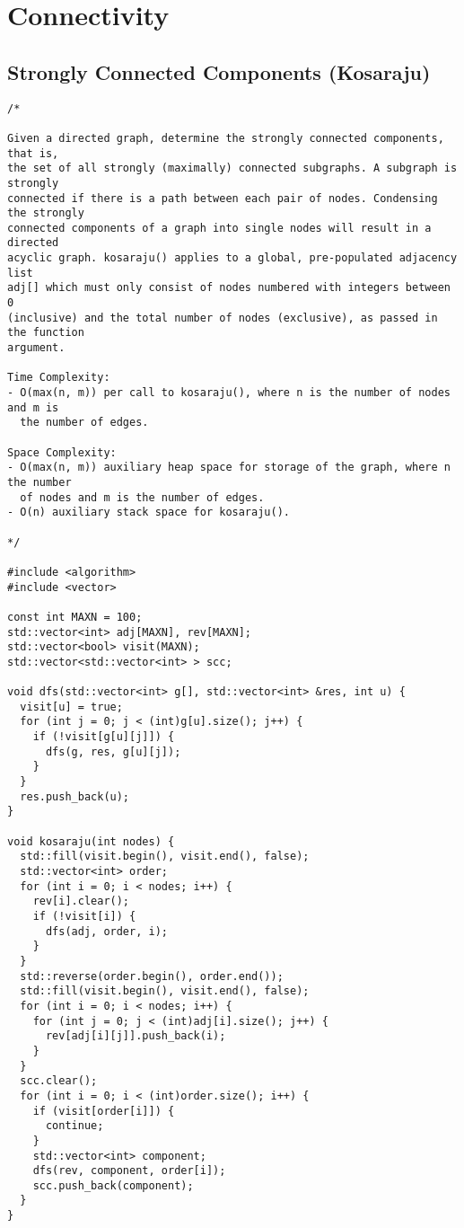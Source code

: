 \section{Connectivity}
\setcounter{section}{3}
\setcounter{subsection}{0}
\subsection{Strongly Connected Components (Kosaraju)}
\begin{lstlisting}
/*

Given a directed graph, determine the strongly connected components, that is,
the set of all strongly (maximally) connected subgraphs. A subgraph is strongly
connected if there is a path between each pair of nodes. Condensing the strongly
connected components of a graph into single nodes will result in a directed
acyclic graph. kosaraju() applies to a global, pre-populated adjacency list
adj[] which must only consist of nodes numbered with integers between 0
(inclusive) and the total number of nodes (exclusive), as passed in the function
argument.

Time Complexity:
- O(max(n, m)) per call to kosaraju(), where n is the number of nodes and m is
  the number of edges.

Space Complexity:
- O(max(n, m)) auxiliary heap space for storage of the graph, where n the number
  of nodes and m is the number of edges.
- O(n) auxiliary stack space for kosaraju().

*/

#include <algorithm>
#include <vector>

const int MAXN = 100;
std::vector<int> adj[MAXN], rev[MAXN];
std::vector<bool> visit(MAXN);
std::vector<std::vector<int> > scc;

void dfs(std::vector<int> g[], std::vector<int> &res, int u) {
  visit[u] = true;
  for (int j = 0; j < (int)g[u].size(); j++) {
    if (!visit[g[u][j]]) {
      dfs(g, res, g[u][j]);
    }
  }
  res.push_back(u);
}

void kosaraju(int nodes) {
  std::fill(visit.begin(), visit.end(), false);
  std::vector<int> order;
  for (int i = 0; i < nodes; i++) {
    rev[i].clear();
    if (!visit[i]) {
      dfs(adj, order, i);
    }
  }
  std::reverse(order.begin(), order.end());
  std::fill(visit.begin(), visit.end(), false);
  for (int i = 0; i < nodes; i++) {
    for (int j = 0; j < (int)adj[i].size(); j++) {
      rev[adj[i][j]].push_back(i);
    }
  }
  scc.clear();
  for (int i = 0; i < (int)order.size(); i++) {
    if (visit[order[i]]) {
      continue;
    }
    std::vector<int> component;
    dfs(rev, component, order[i]);
    scc.push_back(component);
  }
}


\end{lstlisting}
